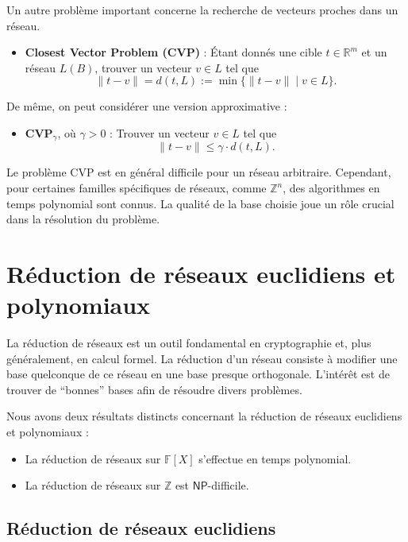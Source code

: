 \documentclass[a4paper,12pt]{report}  %
\theoremstyle{definitionstyle}
\theoremstyle{examplestyle}
\theoremstyle{remarkstyle}
\theoremstyle{propositionstyle}
\theoremstyle{theoremstyle}
\begin{document}
	Un autre problème important concerne la recherche de vecteurs proches dans un réseau.
	
	\begin{itemize}
		\item \textbf{Closest Vector Problem (CVP)} : Étant donnés une cible $t \in \mathbb{R}^m$ et un réseau $L(B)$, trouver un vecteur $v \in L$ tel que 
		\[
		\|t - v\| = d(t, L) := \min \{ \|t - v\| \mid v \in L \}.
		\]
	\end{itemize}
	
	De même, on peut considérer une version approximative :
	
	\begin{itemize}
		\item \textbf{CVP$_\gamma$}, où $\gamma > 0$ : Trouver un vecteur $v \in L$ tel que 
		\[
		\|t - v\| \leq \gamma \cdot d(t, L).
		\]
	\end{itemize}
	
	Le problème CVP est en général difficile pour un réseau arbitraire. Cependant, pour certaines familles spécifiques de réseaux, comme $\mathbb{Z}^n$, des algorithmes en temps polynomial sont connus. La qualité de la base choisie joue un rôle crucial dans la résolution du problème.
		
	\section{Réduction de réseaux euclidiens et polynomiaux}
	
	
	La réduction de réseaux est un outil fondamental en cryptographie et, plus généralement, en calcul formel. La réduction d'un réseau consiste à modifier une base quelconque de ce réseau en une base presque orthogonale. L'intérêt est de trouver de ``bonnes'' bases afin de résoudre divers problèmes.
	
	Nous avons deux résultats distincts concernant la réduction de réseaux euclidiens et polynomiaux :
	
	\begin{itemize}
		\item La réduction de réseaux sur $\mathbb{F}[X]$ s'effectue en temps polynomial.
		\item La réduction de réseaux sur $\mathbb{Z}$ est $\mathsf{NP}$-difficile.
	\end{itemize}	
	
	\subsection{Réduction de réseaux euclidiens}
	
\end{document}
